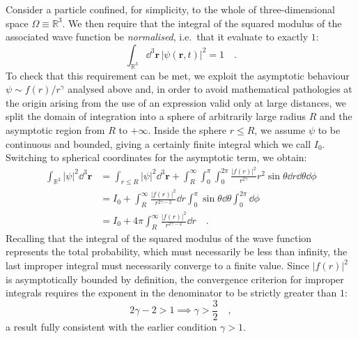 Consider a particle confined, for simplicity, to the whole of three-dimensional space $\Omega \equiv \mathbb{R}^3$. We then require that the integral of the squared modulus of the associated wave function be \emph{normalised}, i.e.\ that it evaluate to exactly $1$:
\begin{equation}
    \int_{\mathbb{R}^3}  \dd^3{\bm{r}} \, |\psi(\bm{r},t)|^2 = 1 \quad.
    \label{eq:normalizzazione_ps}
\end{equation}
To check that this requirement can be met, we exploit the asymptotic behaviour $\psi \sim f(r)/r^\gamma$ analysed above and, in order to avoid mathematical pathologies at the origin arising from the use of an expression valid only at large distances, we split the domain of integration into a sphere of arbitrarily large radius $R$ and the asymptotic region from $R$ to $+\infty$. Inside the sphere $r \le R$, we assume $\psi$ to be continuous and bounded, giving a certainly finite integral which we call $I_0$. Switching to spherical coordinates for the asymptotic term, we obtain:
\begin{equation}
\begin{aligned}
    \int_{\mathbb{R}^3} |\psi|^2 \dd^3{\bm{r}} &= \int_{r \le R} |\psi|^2 \dd^3{\bm{r}} + \int_R^\infty \int_0^\pi \int_0^{2\pi} \frac{|f(r)|^2}{r^{2\gamma}} r^2 \sin \theta \dd{r} \dd{\theta} \dd{\phi} \\
    &= I_0 + \int_R^\infty \frac{|f(r)|^2}{r^{2\gamma-2}} \dd{r} {\int_0^\pi \sin\theta \dd{\theta}} {\int_0^{2\pi} \dd{\phi}} \\
    &= I_0 + 4\pi \int_R^\infty \frac{|f(r)|^2}{r^{2\gamma-2}} \dd{r} \quad.
    \label{eq:int_mod_quad}
\end{aligned}
\end{equation}
Recalling that the integral of the squared modulus of the wave function represents the total probability, which must necessarily be less than infinity, the last improper integral must necessarily converge to a finite value. Since $|f(r)|^2$ is asymptotically bounded by definition, the convergence criterion for improper integrals requires the exponent in the denominator to be strictly greater than $1$:
\begin{equation}
    2\gamma - 2 > 1 \implies \gamma > \frac{3}{2} \quad,
\end{equation}
a result fully consistent with the earlier condition $\gamma > 1$.


